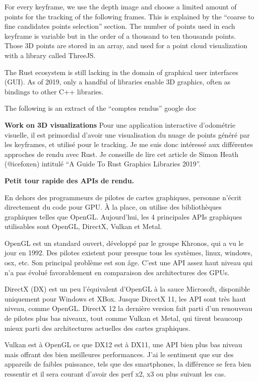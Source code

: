 For every keyframe, we use the depth image and choose a limited amount of points
for the tracking of the following frames.
This is explained by the ``coarse to fine candidates points selection'' section.
The number of points used in each keyframe is variable but in the order of a thousand
to ten thousands points.
Those 3D points are stored in an array,
and used for a point cloud visualization with a library called ThreeJS.

The Rust ecosystem is still lacking in the domain of graphical user interfaces (GUI).
As of 2019, only a handful of libraries enable 3D graphics,
often as bindings to other C++ libraries.

\alert{The following is an extract of the ``comptes rendus'' google doc}

\textbf{Work on 3D visualizations}
Pour une application interactive d’odométrie visuelle, il est primordial d’avoir une visualisation du nuage de points généré par les keyframes, et utilisé pour le tracking. Je me suis donc intéressé aux différentes approches de rendu avec Rust. Je conseille de lire cet article de Simon Heath (@icefoxen) intitulé “A Guide To Rust Graphics Libraries 2019”.

\textbf{Petit tour rapide des APIs de rendu.}

En dehors des programmeurs de pilotes de cartes graphiques, personne n'écrit directement du code pour GPU. À la place, on utilise des bibliothèques graphiques telles que OpenGL. Aujourd'hui, les 4 principales APIs graphiques utilisables sont OpenGL, DirectX, Vulkan et Metal.

OpenGL est un standard ouvert, développé par le groupe Khronos, qui a vu le jour en 1992. Des pilotes existent pour presque tous les systèmes, linux, windows, osx, etc. Son principal problème est son âge. C'est une API assez haut niveau qui n'a pas évolué favorablement en comparaison des architectures des GPUs.

DirectX (DX) est un peu l'équivalent d'OpenGL à la sauce Microsoft, disponible uniquement pour Windows et XBox. Jusque DirectX 11, les API sont très haut niveau, comme OpenGL. DirectX 12 la dernière version fait parti d'un renouveau de pilotes plus bas niveaux, tout comme Vulkan et Metal, qui tirent beaucoup mieux parti des architectures actuelles des cartes graphiques.

Vulkan est à OpenGL ce que DX12 est à DX11, une API bien plus bas niveau mais offrant des bien meilleures performances. J'ai le sentiment que sur des appareils de faibles puissance, tels que des smartphones, la différence se fera bien ressentir et il sera courant d'avoir des perf x2, x3 ou plus suivant les cas.

